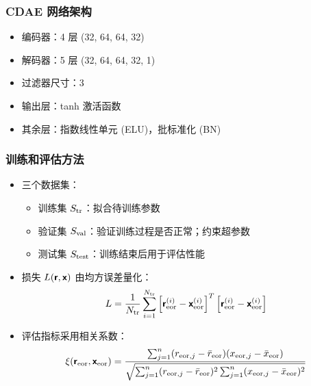 \documentclass{beamer}
\begin{document}
\begin{frame}[subsec]
  \frametitle{CDAE 网络架构}
  \begin{itemize}
    \item 编码器：4 层 (32, 64, 64, 32)
    \item 解码器：5 层 (32, 64, 64, 32, 1)
    \item 过滤器尺寸：3
    \item 输出层：\alert{tanh} 激活函数
    \item 其余层：\alert{指数线性单元} (ELU)，\alert{批标准化} (BN)
  \end{itemize}

  \begin{figure}
  \end{figure}
\end{frame}

\begin{frame}[subsec]
  \frametitle{训练和评估方法}
  \begin{itemize}
    \item 三个数据集：
      \begin{itemize}
        \item \alert{训练集 $S_{\text{tr}}$}：拟合待训练参数
        \item \alert{验证集 $S_{\text{val}}$}：验证训练过程是否正常；约束超参数
        \item \alert{测试集 $S_{\text{test}}$}：训练结束后用于评估性能
      \end{itemize}
    \item 损失 $L(\bm{\mathsf{r}}, \bm{\mathsf{x}})$ 由\alert{均方误差}量化：
      \begin{equation}
        L = \frac{1}{N_{\text{tr}}} \sum_{i=1}^{N_{\text{tr}}}
            \left[ \bm{\mathsf{r}}_{\text{eor}}^{(i)} - \bm{\mathsf{x}}_{\text{eor}}^{(i)} \right]^T
            \left[ \bm{\mathsf{r}}_{\text{eor}}^{(i)} - \bm{\mathsf{x}}_{\text{eor}}^{(i)} \right]
      \end{equation}
    \item 评估指标采用\alert{相关系数}：
      \begin{equation}
        \xi(\bm{\mathsf{r}}_{\text{eor}}, \bm{\mathsf{x}}_{\text{eor}})
          = \frac{\sum_{j=1}^{n}(r_{\text{eor},j} - \bar{r}_{\text{eor}})
              (x_{\text{eor},j} - \bar{x}_{\text{eor}})}{
                \sqrt{\sum_{j=1}^{n}(r_{\text{eor},j} - \bar{r}_{\text{eor}})^2
                \sum_{j=1}^{n}(x_{\text{eor},j} - \bar{x}_{\text{eor}})^2}
            }
      \end{equation}
  \end{itemize}
\end{frame}
\end{document}

